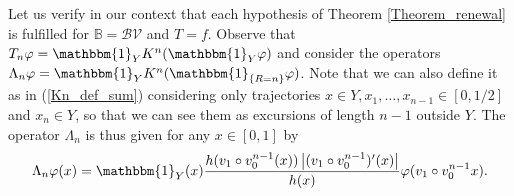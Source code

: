 \documentclass{ws-sd}
\newcommand{\indic}{\mathbbm{1}}
\newcommand{\abs}[1]{\left\lvert #1 \right\rvert}
\begin{document}
Let us verify in our context that each hypothesis of Theorem \ref{Theorem_renewal} is fulfilled for $\mathbb{B} = \mathcal{BV}$ and $T = f$.
Observe that $T_n\varphi = \indic_{Y} K^n(\indic_{Y}\varphi)$ and consider the operators $\Lambda_n\varphi = \indic_{Y}K^n(\indic_{\{R = n\}}\varphi)$. Note that we can also define it as in (\ref{Kn_def_sum}) considering only trajectories $x \in Y, x_1,\ldots,x_{n-1} \in [0,1/2]$ and $x_n \in Y$, so that we can see them as excursions of length $n-1$ outside $Y$. The operator $\Lambda_n$ is thus given for any $x \in [0,1]$ by ~
\begin{align*}
    \Lambda_n \varphi (x) =\indic_{Y}(x) \frac{h(v_1 \circ v_0^{n-1}(x)) \abs{(v_1 \circ v_0^{n-1})'(x)}}{h(x)} \varphi(v_1 \circ v_0^{n-1}x).
\end{align*}
~\\[11pt]
\end{document}
